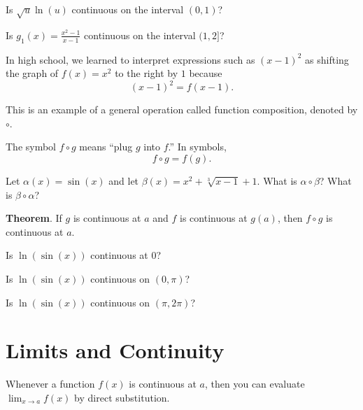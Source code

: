 \documentclass[../main.tex]{subfiles}
\begin{document}
\begin{example}
  Is \(\sqrt{u}\ln(u)\) continuous on the interval \((0,1)\)?
\end{example}
\vspace{1in}

\begin{example}
  Is \(g_{1}(x) = \frac{x^{2} - 1}{x-1}\) continuous on the interval \((1,2]\)?
\end{example}
\vspace{1.5in}

In high school, we learned to interpret expressions such as \((x-1)^{2}\) as shifting the graph of \(f(x) = x^{2}\) to the right by \(1\) because
\[
  (x-1)^{2} = f(x-1).
\]

This is an example of a general operation called {function composition}, denoted by \(\circ\). 

The symbol \(f \circ g\) means ``plug \(g\) into \(f\).'' In symbols, 
\[
  f \circ g = {f(g).}
\]
\begin{example}
  Let \(\alpha(x) = \sin(x)\) and let \(\beta(x) = x^{2} + \sqrt[3]{x - 1} + 1\). What is \(\alpha \circ \beta\)? What is \(\beta \circ \alpha\)?
\end{example}
\clearpage

\begin{mdframed}[style=withref]
  \textbf{Theorem}. If \(g\) is continuous at \(a\) and \(f\) is continuous at \(g(a)\), then \(f \circ g\) is continuous at \(a\).

\end{mdframed}

\begin{example}
  Is \(\ln(\sin(x))\) continuous at \(0\)?
\end{example}
\vspace{1.5in}

\begin{example}
  Is \(\ln(\sin(x))\) continuous on \((0,\pi)\)?
\end{example}
\vspace{1.5in}

\begin{example}
  Is \(\ln(\sin(x))\) continuous on \((\pi,2 \pi)\)?
\end{example}
\vspace{1.5in}

\section{Limits and Continuity}
Whenever a function \(f(x)\) is {continuous} at \(a\), then you can evaluate \(\lim_{x \to a} f(x)\) by direct substitution.
\end{document}
